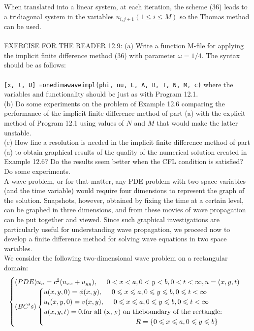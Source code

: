 \documentclass[../main.tex]{subfiles}
\begin{document}
When translated into a linear system, at each iteration, the scheme (36) leads to a tridiagonal system in the variables $u_{i,j+1} (1\leqslant i \leqslant M)$ so the Thomas method can be used. 
\\
\\
EXERCISE FOR THE READER 12.9: (a) Write a function M-file for applying the implicit finite difference method (36) with parameter $\omega = 1/4$. The syntax should be as follows: 
\\
\\
\texttt{[x, t, U] =onedimawaveimpl(phi, nu, L, A, B, T, N, M, c)}
where the variables and functionality should be just as with Program 12.1. 
\\
(b) Do some experiments on the problem of Example 12.6 comparing the performance of the implicit finite difference method of part (a) with the explicit method of Program 12.1 using values of $N$ and $M$ that would make the latter 
unstable.
\\
(c) How fine a resolution is needed in the implicit finite difference method of part (a) to obtain graphical results of the quality of the numerical solution created in Example 12.6? Do the results seem better when the CFL condition is satisfied? Do some experiments.
\\


A wave problem, or for that matter, any PDE problem with two space variables (and the time variable) would require four dimensions to represent the graph of the solution. Snapshots, however, obtained by fixing the time at a certain level, can be graphed in three dimensions, and from these movies of wave propagation can be put together and viewed. Since such graphical investigations are particularly useful for understanding wave propagation, we proceed now to develop a finite difference method for solving wave equations in two space variables.
\\

We consider the following two-dimensional wave problem on a rectangular 
domain:
\begin{equation}
	\begin{cases} 
	(PDE) u_u=c^2 (u_{xx}+u_{yy}),~~~~0<x<a, 0<y<b,0<t<\infty,u=(x,y,t)\\
(BC's)
		\begin{cases}
		u(x,y,0)=\phi(x,y), ~~~~ 0\leqslant x \leqslant a,0\leqslant y \leqslant b, 0 \leqslant t< \infty \\
		u_t(x,y,0)=v(x,y), ~~~~ 0\leqslant x \leqslant a,0\leqslant y \leqslant b, 0 \leqslant t< \infty \\
		 u(x, y, t) = 0, $for all (x, y) on theboundary of the rectangle:$\\
		 ~~~~~~~~~~~~~~~~~~~~~~~~~~~~~~~~~~~~~~~~ R= \lbrace 0\leqslant x\leqslant a, 0\leqslant y \leqslant b \rbrace
		\end{cases} 
	\end{cases}
\end{equation}
\end{document}
